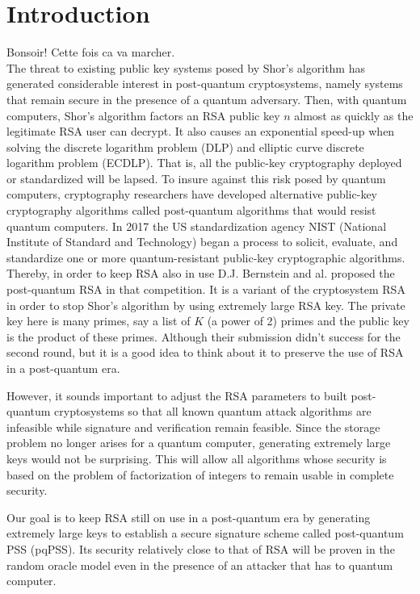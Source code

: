 \documentclass[a4paper,11pt]{article}
\begin{document}
\section{Introduction}
Bonsoir! Cette fois ca va marcher.\\
The threat to existing public key systems posed by Shor's algorithm \cite{Shor} has generated considerable interest in post-quantum cryptosystems, namely systems that remain secure in the presence of a quantum adversary. Then, with quantum computers, Shor's algorithm factors an RSA public key $n$ almost as quickly as the legitimate RSA user can decrypt. It also causes an exponential speed-up when solving the discrete logarithm problem (DLP) and elliptic curve discrete logarithm problem (ECDLP). That is, all the public-key cryptography deployed or standardized will be lapsed. To insure against this risk posed by quantum computers, cryptography
researchers have developed alternative public-key cryptography algorithms called
post-quantum algorithms that would resist quantum computers. In 2017 the US standardization
agency NIST (National Institute of Standard and Technology) began a process to solicit, evaluate, and standardize one or more quantum-resistant public-key cryptographic algorithms. Thereby, in order to keep RSA also in use D.J. Bernstein and al. proposed the post-quantum RSA \cite{pqRSA} in that competition. It is a variant of the cryptosystem RSA in order to stop Shor's algorithm by using extremely large RSA key. The private key here is many primes, say a list of $K$ (a power of 2) primes and the public key is the product of these primes. Although their submission didn't success for the second round, but it is a good idea to think about it to preserve the use of RSA in a post-quantum era.

However, it sounds important to adjust the RSA parameters to built post-quantum cryptosystems so that all known quantum attack algorithms are infeasible while signature and verification remain feasible. Since the storage problem no longer arises for a quantum computer, generating extremely large keys would not be surprising. This will allow all algorithms whose security is based on the problem of factorization of integers to remain usable in complete security.


  Our goal is to keep RSA still on use in a post-quantum era by generating extremely large keys to establish a secure signature scheme called post-quantum PSS (pqPSS). Its security relatively close to that of RSA will be proven in the random oracle model even in the presence of an attacker that has to quantum computer.
\end{document}
